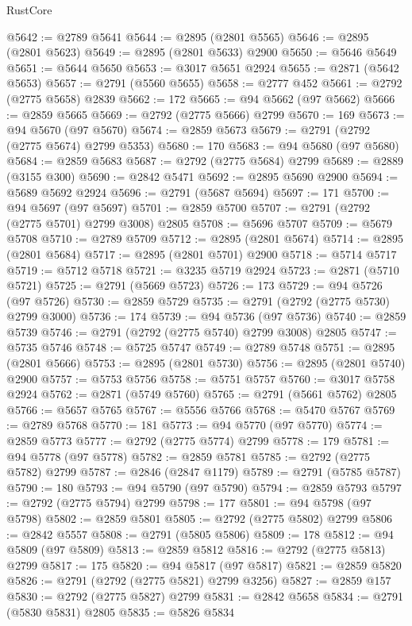 \begin{lexlean}{RustCore}
\begin{coremodule}
@5642 := @2789 @5641
@5644 := @2895 (@2801 @5565)
@5646 := @2895 (@2801 @5623)
@5649 := @2895 (@2801 @5633) @2900
@5650 := @5646 @5649
@5651 := @5644 @5650
@5653 := @3017 @5651 @2924
@5655 := @2871 (@5642 @5653)
@5657 := @2791 (@5560 @5655)
@5658 := @2777 @452
@5661 := @2792 (@2775 @5658) @2839
@5662 := 172
@5665 := @94 @5662 (@97 @5662)
@5666 := @2859 @5665
@5669 := @2792 (@2775 @5666) @2799
@5670 := 169
@5673 := @94 @5670 (@97 @5670)
@5674 := @2859 @5673
@5679 := @2791 (@2792 (@2775 @5674) @2799 @5353)
@5680 := 170
@5683 := @94 @5680 (@97 @5680)
@5684 := @2859 @5683
@5687 := @2792 (@2775 @5684) @2799
@5689 := @2889 (@3155 @300)
@5690 := @2842 @5471
@5692 := @2895 @5690 @2900
@5694 := @5689 @5692 @2924
@5696 := @2791 (@5687 @5694)
@5697 := 171
@5700 := @94 @5697 (@97 @5697)
@5701 := @2859 @5700
@5707 := @2791 (@2792 (@2775 @5701) @2799 @3008) @2805
@5708 := @5696 @5707
@5709 := @5679 @5708
@5710 := @2789 @5709
@5712 := @2895 (@2801 @5674)
@5714 := @2895 (@2801 @5684)
@5717 := @2895 (@2801 @5701) @2900
@5718 := @5714 @5717
@5719 := @5712 @5718
@5721 := @3235 @5719 @2924
@5723 := @2871 (@5710 @5721)
@5725 := @2791 (@5669 @5723)
@5726 := 173
@5729 := @94 @5726 (@97 @5726)
@5730 := @2859 @5729
@5735 := @2791 (@2792 (@2775 @5730) @2799 @3000)
@5736 := 174
@5739 := @94 @5736 (@97 @5736)
@5740 := @2859 @5739
@5746 := @2791 (@2792 (@2775 @5740) @2799 @3008) @2805
@5747 := @5735 @5746
@5748 := @5725 @5747
@5749 := @2789 @5748
@5751 := @2895 (@2801 @5666)
@5753 := @2895 (@2801 @5730)
@5756 := @2895 (@2801 @5740) @2900
@5757 := @5753 @5756
@5758 := @5751 @5757
@5760 := @3017 @5758 @2924
@5762 := @2871 (@5749 @5760)
@5765 := @2791 (@5661 @5762) @2805
@5766 := @5657 @5765
@5767 := @5556 @5766
@5768 := @5470 @5767
@5769 := @2789 @5768
@5770 := 181
@5773 := @94 @5770 (@97 @5770)
@5774 := @2859 @5773
@5777 := @2792 (@2775 @5774) @2799
@5778 := 179
@5781 := @94 @5778 (@97 @5778)
@5782 := @2859 @5781
@5785 := @2792 (@2775 @5782) @2799
@5787 := @2846 (@2847 @1179)
@5789 := @2791 (@5785 @5787)
@5790 := 180
@5793 := @94 @5790 (@97 @5790)
@5794 := @2859 @5793
@5797 := @2792 (@2775 @5794) @2799
@5798 := 177
@5801 := @94 @5798 (@97 @5798)
@5802 := @2859 @5801
@5805 := @2792 (@2775 @5802) @2799
@5806 := @2842 @5557
@5808 := @2791 (@5805 @5806)
@5809 := 178
@5812 := @94 @5809 (@97 @5809)
@5813 := @2859 @5812
@5816 := @2792 (@2775 @5813) @2799
@5817 := 175
@5820 := @94 @5817 (@97 @5817)
@5821 := @2859 @5820
@5826 := @2791 (@2792 (@2775 @5821) @2799 @3256)
@5827 := @2859 @157
@5830 := @2792 (@2775 @5827) @2799
@5831 := @2842 @5658
@5834 := @2791 (@5830 @5831) @2805
@5835 := @5826 @5834

\end{coremodule}
\end{lexlean}
